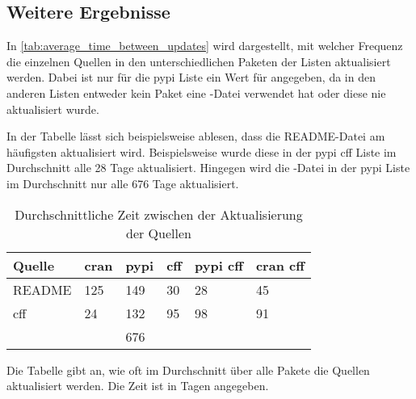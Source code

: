\subsection*{Weitere Ergebnisse}
In \autoref{tab:average_time_between_updates} wird dargestellt, mit welcher Frequenz die einzelnen Quellen in den unterschiedlichen Paketen der Listen aktualisiert werden.
Dabei ist nur für die \gls{pypi} Liste ein Wert für  angegeben, da in den anderen Listen entweder kein Paket eine -Datei verwendet hat oder diese nie aktualisiert wurde.

In der Tabelle lässt sich beispielsweise ablesen, dass die README-Datei am häufigsten aktualisiert wird.
Beispielsweise wurde diese in der \gls{pypi} \gls{cff} Liste im Durchschnitt alle 28 Tage aktualisiert.
Hingegen wird die -Datei in der \gls{pypi} Liste im Durchschnitt nur alle 676 Tage aktualisiert.

\begin{table}
    \begin{tabularx}{\textwidth}{XR{1.3cm}R{1.3cm}R{1.3cm}R{2.4cm}R{2.6cm}}
        \toprule
        \textbf{Quelle} & \textbf{\gls{cran}} & \textbf{\gls{pypi}} & \textbf{\gls{cff}} & \textbf{\gls{pypi} \gls{cff}} & \textbf{\gls{cran} \gls{cff}} \\ \midrule
        README          & 125 & 149 & 30 & 28 & 45 \\
        \gls{cff}       & 24  & 132 & 95 & 98 & 91 \\
         &     & 676 &    &    &    \\
        \bottomrule
    \end{tabularx}
    \caption{Durchschnittliche Zeit zwischen der Aktualisierung der Quellen}
    \label{tab:average_time_between_updates}
    \small
    Die Tabelle gibt an, wie oft im Durchschnitt über alle Pakete die Quellen aktualisiert werden. Die Zeit ist in Tagen angegeben.
\end{table}
